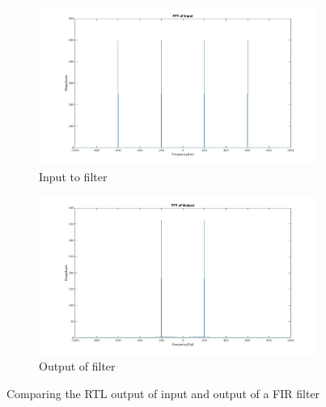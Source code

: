 \documentclass{beamer}
\begin{document}
\begin{frame}
	\begin{figure}
	\centering
	\begin{subfigure}{.5\textwidth}
  	\centering
  	\includegraphics[width=\linewidth]{./figs/filter_input.jpg}
  	\caption{Input to filter}
  	\label{fig:sub1}
	\end{subfigure}%
	\begin{subfigure}{.5\textwidth}
  	\centering
  	\includegraphics[width=\linewidth]{./figs/filter_output.jpg}
  	\caption{Output of filter}
  	\label{fig:sub2}
	\end{subfigure}
	\caption{Comparing the RTL output of input and output of a FIR filter}
	\label{fig:test}
	\end{figure}
\end{frame}
\end{document}
